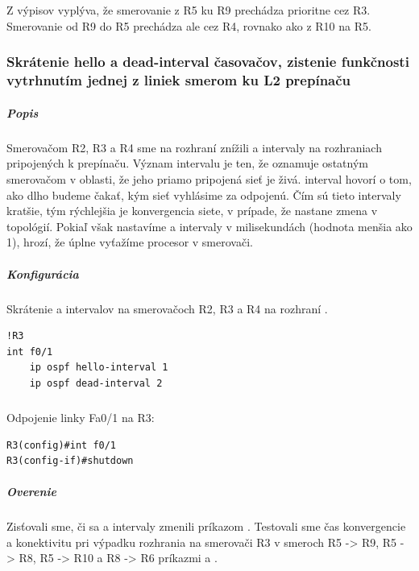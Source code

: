 \documentclass[12pt,twoside,a4paper]{article}
\begin{document}
\subparagraph{}
Z výpisov vyplýva, že smerovanie z R5 ku R9 prechádza prioritne cez R3. Smerovanie od R9 do R5 prechádza ale cez R4, rovnako ako z R10 na R5.


\subsubsection*{Skrátenie hello a dead-interval časovačov, zistenie funkčnosti vytrhnutím jednej z liniek smerom ku L2 prepínaču}

\subparagraph{Popis}
\subparagraph{}
Smerovačom R2, R3 a R4 sme na rozhraní  znížili  a  intervaly na rozhraniach pripojených k prepínaču. Význam  intervalu je ten, že oznamuje ostatným smerovačom v oblasti, že jeho priamo pripojená sieť je živá.  interval hovorí o tom, ako dlho budeme čakať, kým sieť vyhlásime za odpojenú. Čím sú tieto intervaly kratšie, tým rýchlejšia je konvergencia siete, v prípade, že nastane zmena v topológií. Pokiaľ však nastavíme  a  intervaly v milisekundách (hodnota menšia ako 1), hrozí, že úplne vyťažíme procesor v smerovači.

\subparagraph{Konfigurácia}
\subparagraph{}
Skrátenie  a  intervalov na smerovačoch R2, R3 a R4 na rozhraní .

\noindent
{\selectfont
\begin{small}
\begin{verbatim}
!R3
int f0/1
    ip ospf hello-interval 1
    ip ospf dead-interval 2

\end{verbatim}
\end{small}
}

\subparagraph{}
Odpojenie linky Fa0/1 na R3:

\noindent
{\selectfont
\begin{small}
\begin{verbatim}
R3(config)#int f0/1
R3(config-if)#shutdown

\end{verbatim}
\end{small}
}


\subparagraph{Overenie}
\subparagraph{}
Zisťovali sme, či sa  a  intervaly zmenili príkazom . Testovali sme čas konvergencie a konektivitu pri výpadku rozhrania  na smerovači R3 v smeroch R5 -\textgreater{} R9, R5 -\textgreater{} R8, R5 -\textgreater{} R10 a R8 -\textgreater{} R6 príkazmi  a .
\end{document}
